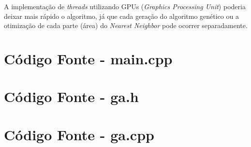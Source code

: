 \documentclass[12pt,openright,a4paper,oneside]{tcc}
\begin{document}
    A implementação de \textit{threads} utilizando GPUs (\textit{Graphics Processing Unit}) poderia deixar mais rápido o algoritmo, já que cada geração do algoritmo genético ou a otimização de cada parte (área) do \textit{Nearest Neighbor} pode ocorrer separadamente.
    
	\postextual
	

	\apendices
	\chapter{Código Fonte - main.cpp}
	
	\chapter{Código Fonte - ga.h}
	
	\chapter{Código Fonte - ga.cpp}
	
    \newpage
\end{document}
